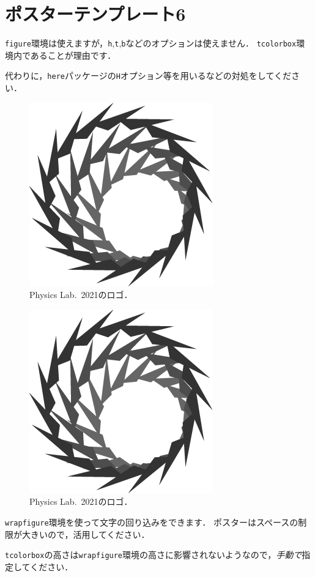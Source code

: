 \documentclass[12pt, a4j, dvipdfmx, sffamily]{jsarticle}
\begin{document}
\section*{ポスターテンプレート6}
\begin{tcbraster}[raster columns = 1]
	\begin{tcolorbox}[title = 画像（\texttt{figure}環境）]
	\texttt{figure}環境は使えますが，\texttt{h},\texttt{t},\texttt{b}などのオプションは使えません．
	\texttt{tcolorbox}環境内であることが理由です．
	
	代わりに，\texttt{here}パッケージの\texttt{H}オプション等を用いるなどの対処をしてください．
	\begin{figure}[H]
	\centering
	\includegraphics[width=0.2\linewidth]{logo_test.png}
	\caption{Physics Lab.~2021のロゴ．}
	\end{figure}
	\end{tcolorbox}
	\begin{tcolorbox}[title = 画像（\texttt{wrapfigure}環境）, height = 0.4\linewidth]
	\begin{figure}
	\centering
	\includegraphics[width=\linewidth]{logo_test.png}
	\caption{Physics Lab.~2021のロゴ．}
	\end{figure}
	\texttt{wrapfigure}環境を使って文字の回り込みをできます．
	ポスターはスペースの制限が大きいので，活用してください．
	
	\texttt{tcolorbox}の高さは\texttt{wrapfigure}環境の高さに影響されないようなので，\emph{手動で}指定してください．
	\end{tcolorbox}
\end{tcbraster}
\end{document}

